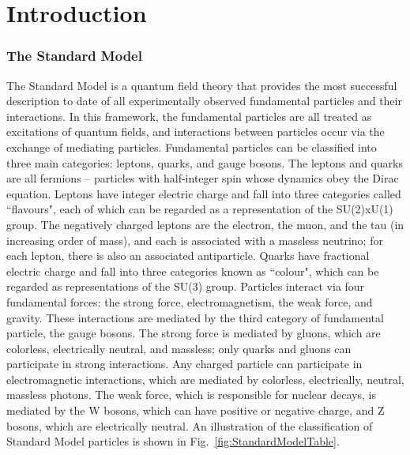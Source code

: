 \chapter{Introduction\label{sec:intro}}



\subsection{The Standard Model\label{sec:SM}}

The Standard Model is a quantum field theory that provides the most successful description to date of all experimentally observed fundamental particles and their interactions. In this framework, the fundamental particles are all treated as excitations of quantum fields, and interactions between particles occur via the exchange of mediating particles.
Fundamental particles can be classified into three main categories: leptons, quarks, and gauge bosons. The leptons and quarks are all fermions -- particles with half-integer spin whose dynamics obey the Dirac equation. Leptons have integer electric charge and fall into three categories called ``flavours", each of which can be regarded as a representation of the SU(2)xU(1) group. The negatively charged leptons are the electron, the muon, and the tau (in increasing order of mass), and each is associated with a massless neutrino; for each lepton, there is also an associated antiparticle. Quarks have fractional electric charge and fall into three categories known as ``colour", which can be regarded as representations of the SU(3) group.
Particles interact via four fundamental forces: the strong force, electromagnetism, the weak force, and gravity. These interactions are mediated by the third category of fundamental particle, the gauge bosons. The strong force is mediated by gluons, which are colorless, electrically neutral, and massless; only quarks and gluons can participate in strong interactions. Any charged particle can participate in electromagnetic interactions, which are mediated by colorless, electrically, neutral, massless photons. The weak force, which is responsible for nuclear decays, is mediated by the W bosons, which can have positive or negative charge, and Z bosons, which are electrically neutral.
An illustration of the classification of Standard Model particles is shown in Fig.~\ref{fig:StandardModelTable}.

